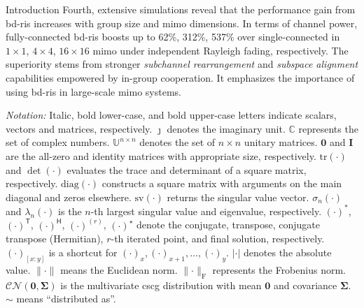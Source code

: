 \documentclass[journal]{IEEEtran}
\begin{document}
\begin{section}{Introduction}
	Fourth, extensive simulations reveal that the performance gain from \gls{bd}-\gls{ris} increases with group size and \gls{mimo} dimensions.
	In terms of channel power, fully-connected \gls{bd}-\gls{ris} boosts up to 62\%, 312\%, 537\% over single-connected in $1 \times 1$, $4 \times 4$, $16 \times 16$ \gls{mimo} under independent Rayleigh fading, respectively.
	The superiority stems from stronger \emph{subchannel rearrangement} and \emph{subspace alignment} capabilities empowered by in-group cooperation.
	It emphasizes the importance of using \gls{bd}-\gls{ris} in large-scale \gls{mimo} systems.


	\emph{Notation:}
	Italic, bold lower-case, and bold upper-case letters indicate scalars, vectors and matrices, respectively.
	$\jmath$ denotes the imaginary unit.
	$\mathbb{C}$ represents the set of complex numbers.
	$\mathbb{U}^{n \times n}$ denotes the set of $n \times n$ unitary matrices.
	$\mathbf{0}$ and $\mathbf{I}$ are the all-zero and identity matrices with appropriate size, respectively.
	$\mathrm{tr}(\cdot)$ and $\det(\cdot)$ evaluates the trace and determinant of a square matrix, respectively.
	$\mathrm{diag}(\cdot)$ constructs a square matrix with arguments on the main diagonal and zeros elsewhere.
	$\mathrm{sv}(\cdot)$ returns the singular value vector.
	$\sigma_n(\cdot)$ and $\lambda_n(\cdot)$ is the $n$-th largest singular value and eigenvalue, respectively.
	$(\cdot)^*$, $(\cdot)^\mathsf{T}$, $(\cdot)^\mathsf{H}$, $(\cdot)^{(r)}$, $(\cdot)^{\star}$ denote the conjugate, transpose, conjugate transpose (Hermitian), $r$-th iterated point, and final solution, respectively.
	$(\cdot)_{[x:y]}$ is a shortcut for $(\cdot)_x,(\cdot)_{x+1},\ldots,(\cdot)_y$.
	$\lvert \cdot \rvert$ denotes the absolute value.
	$\lVert \cdot \rVert$ means the Euclidean norm.
	$\lVert \cdot \rVert _\mathrm{F}$ represents the Frobenius norm.
	$\mathcal{CN}(\mathbf{0}, \mathbf{\Sigma})$ is the multivariate \gls{cscg} distribution with mean $\mathbf{0}$ and covariance $\mathbf{\Sigma}$.
	$\sim$ means ``distributed as''.
\end{section}
\end{document}
